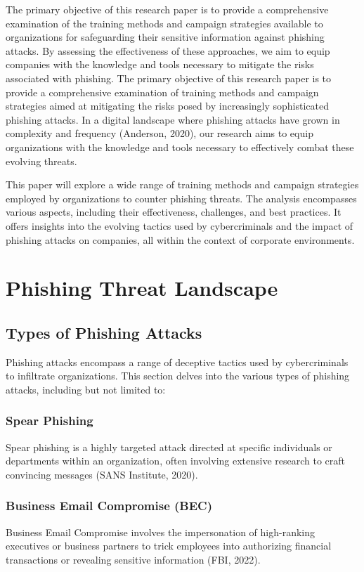 \documentclass[conference]{IEEEtran}
\begin{document}
The primary objective of this research paper is to provide a comprehensive examination of the training methods and campaign strategies available to organizations for safeguarding their sensitive information against phishing attacks. By assessing the effectiveness of these approaches, we aim to equip companies with the knowledge and tools necessary to mitigate the risks associated with phishing. The primary objective of this research paper is to provide a comprehensive examination of training methods and campaign strategies aimed at mitigating the risks posed by increasingly sophisticated phishing attacks. In a digital landscape where phishing attacks have grown in complexity and frequency (Anderson, 2020), our research aims to equip organizations with the knowledge and tools necessary to effectively combat these evolving threats.

This paper will explore a wide range of training methods and campaign strategies employed by organizations to counter phishing threats. The analysis encompasses various aspects, including their effectiveness, challenges, and best practices. It offers insights into the evolving tactics used by cybercriminals and the impact of phishing attacks on companies, all within the context of corporate environments.

\section{Phishing Threat Landscape}

\subsection{Types of Phishing Attacks}

Phishing attacks encompass a range of deceptive tactics used by cybercriminals to infiltrate organizations. This section delves into the various types of phishing attacks, including but not limited to:

\subsubsection{Spear Phishing}
Spear phishing is a highly targeted attack directed at specific individuals or departments within an organization, often involving extensive research to craft convincing messages (SANS Institute, 2020).

\subsubsection{Business Email Compromise (BEC)}
Business Email Compromise involves the impersonation of high-ranking executives or business partners to trick employees into authorizing financial transactions or revealing sensitive information (FBI, 2022).
\end{document}
